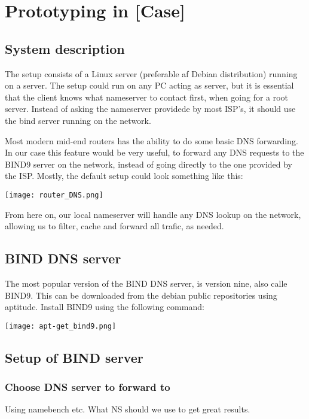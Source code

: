 \chapter{Prototyping in [Case]}

\section{System description}
The setup consists of a Linux server (preferable af Debian distribution) running on a server. The setup could run on any PC acting as server, but it is essential that the client knows what nameserver to contact first, when going for a root server. Instead of asking the nameserver providede by most ISP's, it should use the bind server running on the network.

Most modern mid-end routers has the ability to do some basic DNS forwarding. In our case this feature would be very useful, to forward any DNS requests to the BIND9 server on the network, instead of going directly to the one provided by the ISP. Mostly, the default setup could look something like this:

\begin{center}
	\texttt{[image: router\_DNS.png]}
\end{center}

From here on, our local nameserver will handle any DNS lookup on the network, allowing us to filter, cache and forward all trafic, as needed.

\section{BIND DNS server}
The most popular version of the BIND DNS server, is version nine, also calle BIND9. This can be downloaded from the debian public repositories using aptitude. Install BIND9 using the following command:

\begin{center}
	\texttt{[image: apt-get\_bind9.png]}
\end{center}

\section{Setup of BIND server}



\subsection{Choose DNS server to forward to}
Using namebench etc. What NS should we use to get great results.


